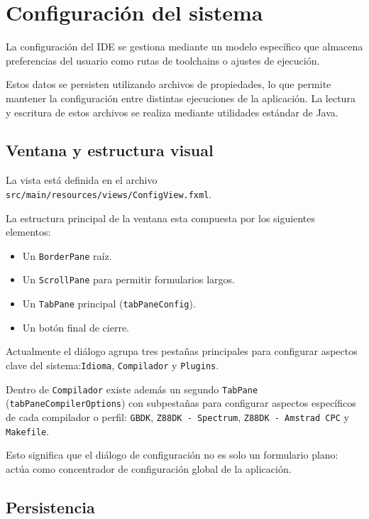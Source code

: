 \documentclass[../../main.tex]{subfiles}
\begin{document}
\section{Configuración del sistema}

La configuración del IDE se gestiona mediante un modelo específico que almacena preferencias del usuario como rutas de toolchains o ajustes de ejecución.

Estos datos se persisten utilizando archivos de propiedades, lo que permite mantener la configuración entre distintas ejecuciones de la aplicación. La lectura y escritura de estos archivos se realiza mediante utilidades estándar de Java.

\subsection{Ventana y estructura visual}

La vista está definida en el archivo \lstinline|src/main/resources/views/ConfigView.fxml|.

La estructura principal de la ventana esta compuesta por los siguientes elementos:

\begin{itemize}
    \item Un \lstinline|BorderPane| raíz.
    \item Un \lstinline|ScrollPane| para permitir formularios largos.
    \item Un \lstinline|TabPane| principal (\lstinline|tabPaneConfig|).
    \item Un botón final de cierre.
\end{itemize}

Actualmente el diálogo agrupa tres pestañas principales para configurar aspectos clave del sistema:\lstinline|Idioma|, \lstinline|Compilador| y \lstinline|Plugins|.

Dentro de \lstinline|Compilador| existe además un segundo \lstinline|TabPane| (\lstinline|tabPaneCompilerOptions|) con subpestañas para configurar aspectos específicos de cada compilador o perfil: \lstinline|GBDK|, \lstinline|Z88DK - Spectrum|, \lstinline|Z88DK - Amstrad CPC| y \lstinline|Makefile|.

Esto significa que el diálogo de configuración no es solo un formulario plano: actúa como concentrador de configuración global de la aplicación.

\subsection{Persistencia}
\end{document}

